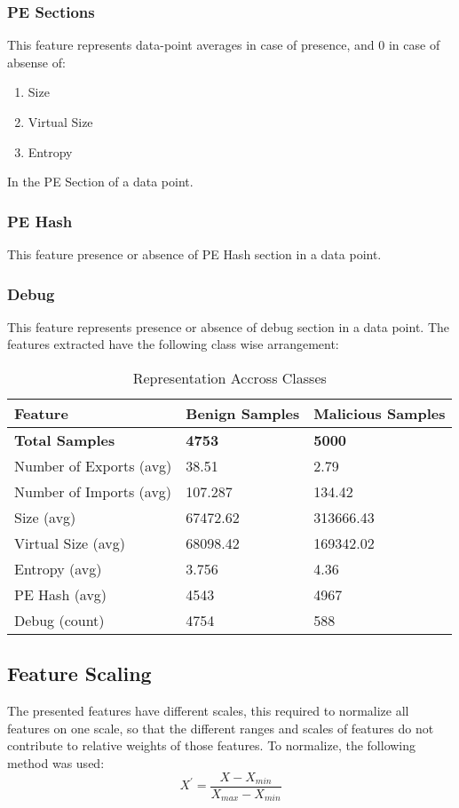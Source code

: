 \documentclass{llncs}
\begin{document}
\subsubsection{PE Sections}
This feature represents data-point averages in case of presence, and 0 in case of absense of:
\begin{enumerate}
	\item Size
	\item Virtual Size
	\item Entropy
\end {enumerate}
In the PE Section of a data point.
\subsubsection{PE Hash}
This feature presence or absence of PE Hash section in a data point.

\subsubsection{Debug}
This feature represents presence or absence of debug section in a data point.
The  features extracted have the following class wise arrangement:

\begin{table}
	\centering
	\caption{Representation Accross Classes}
	\begin{tabular}{ |p{5cm}||p{3cm}||p{3cm}|}
		\hline
		Feature						&Benign Samples 			&Malicious Samples\\
		\hline
		\textbf{Total Samples}				&\textbf{4753}						&\textbf{5000}\\
		\hline
		Number of Exports (avg)     	  &38.51						  &2.79\\
		Number of Imports (avg)   	  &107.287                          &134.42\\
		Size (avg)           					&67472.62					    &313666.43\\
		Virtual Size (avg)      			&68098.42				    &169342.02\\
		Entropy (avg)        					&3.756 							&4.36\\
		PE Hash (avg)        			&4543							&4967\\
		Debug (count)						&4754							&588\\
		 \hline
\end{tabular}
\label{table}
\end{table}


\subsection{Feature Scaling}
The presented features have different scales, this required to normalize all features on one scale, so that the different ranges and scales of features do not contribute to relative weights of those features. To normalize, the following method was used:
\[ X^{'} =\frac{X - X_{min}}{X_{max} - X_{min}}   \]
\end{document}
